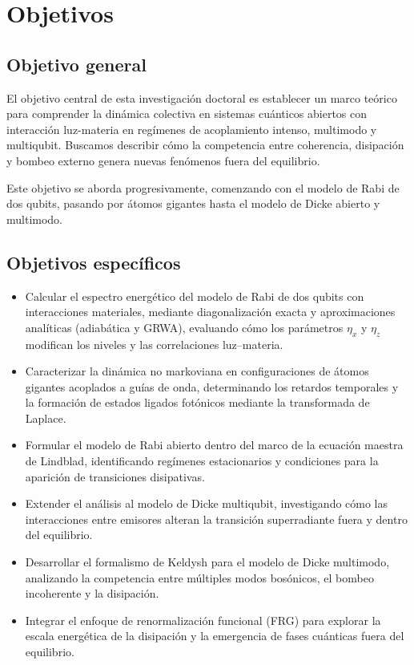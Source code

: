 \documentclass[onecolumn,notitlepage,letterpaper,aps,pra,12pt]{article}
\numberwithin{equation}{section}
\begin{document}
\section{Objetivos}


\subsection{Objetivo general}

El objetivo central de esta investigación doctoral es establecer un marco teórico para comprender la dinámica colectiva en sistemas cuánticos abiertos con interacción luz-materia en regímenes de acoplamiento intenso, multimodo y multiqubit. Buscamos describir cómo la competencia entre coherencia, disipación y bombeo externo genera nuevas fenómenos fuera del equilibrio.

Este objetivo se aborda progresivamente, comenzando con el modelo de Rabi de dos qubits, pasando por átomos gigantes hasta el modelo de Dicke abierto y multimodo. 

\subsection{Objetivos específicos}

\begin{itemize}
    \item Calcular el espectro energético del modelo de Rabi de dos qubits con interacciones materiales, mediante diagonalización exacta y aproximaciones analíticas (adiabática y GRWA), evaluando cómo los parámetros $\eta_x$ y $\eta_z$ modifican los niveles y las correlaciones luz–materia.
    \item Caracterizar la dinámica no markoviana en configuraciones de átomos gigantes acoplados a guías de onda, determinando los retardos temporales y la formación de estados ligados fotónicos mediante la transformada de Laplace.
    \item Formular el modelo de Rabi abierto dentro del marco de la ecuación maestra de Lindblad, identificando regímenes estacionarios y condiciones para la aparición de transiciones disipativas.
    \item Extender el análisis al modelo de Dicke multiqubit, investigando cómo las interacciones entre emisores alteran la transición superradiante fuera y dentro del equilibrio.
    \item Desarrollar el formalismo de Keldysh para el modelo de Dicke multimodo, analizando la competencia entre múltiples modos bosónicos, el bombeo incoherente y la disipación.
    \item Integrar el enfoque de renormalización funcional (FRG) para explorar la escala energética de la disipación y la emergencia de fases cuánticas fuera del equilibrio.
\end{itemize}
\end{document}
